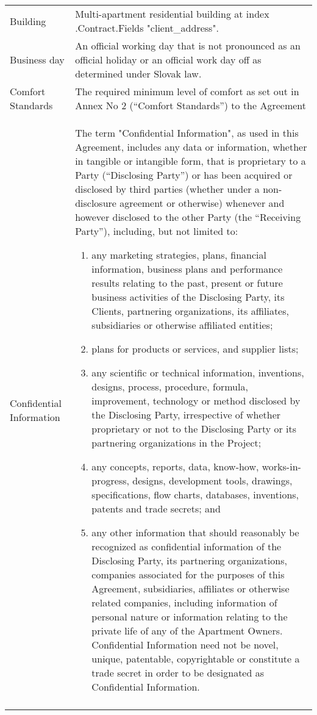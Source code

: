 \documentclass[a4paper]{article}
\begin{document}
\begin{longtabu}{|X|X[2]|}
   \hline

   Building & Multi{-}apartment residential building at  {{index .Contract.Fields "client_address"}}. \\\tabucline{}

   \hline

   Business day & An official working day that is not pronounced as an
   official holiday or an official work day off as determined under
   Slovak law. \\\tabucline{}

   \hline

   Comfort Standards & The required minimum level of comfort as set out
   in Annex No 2 (“Comfort Standards”) to the Agreement \\\tabucline{}

   \hline

   Confidential Information & The term "Confidential Information", as
   used in this Agreement, includes any data or information, whether in
   tangible or intangible form, that is proprietary to a Party
   (“Disclosing Party”) or has been acquired or disclosed by third
   parties (whether under a non{-}disclosure agreement or otherwise)
   whenever and however disclosed to the other Party (the “Receiving
   Party”), including, but not limited to:

   \begin{enumerate}
   \item{any marketing strategies, plans, financial information,
       business plans and performance results relating to the past,
       present or future business activities of the Disclosing Party,
       its Clients, partnering organizations, its affiliates,
       subsidiaries or otherwise affiliated entities;}
   \item{plans for products or services, and supplier lists;}
   \item{any scientific or technical information, inventions, designs,
       process, procedure, formula, improvement, technology or method
       disclosed by the Disclosing Party, irrespective of whether
       proprietary or not to the Disclosing Party or its partnering
       organizations in the Project;}
   \item{any concepts, reports, data, know{-}how,
       works{-}in{-}progress, designs, development tools, drawings,
       specifications, flow charts, databases, inventions, patents and
       trade secrets; and}
   \item{any other information that should reasonably be recognized as
       confidential information of the Disclosing Party, its
       partnering organizations, companies associated for the purposes
       of this Agreement, subsidiaries, affiliates or otherwise
       related companies, including information of personal nature or
       information relating to the private life of any of the
       Apartment Owners.  Confidential Information need not be novel,
       unique, patentable, copyrightable or constitute a trade secret
       in order to be designated as Confidential Information.}
   \end{enumerate} \\\tabucline{}


\end{longtabu}
\end{document}
